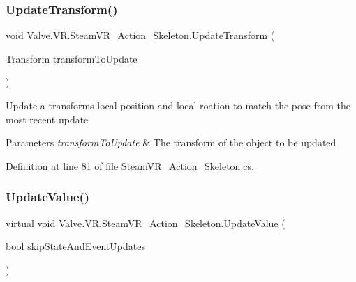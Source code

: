 \mbox{\label{class_valve_1_1_v_r_1_1_steam_v_r___action___skeleton_abe07333258dac738794a0be1b5b8683b}} 
\subsubsection{\texorpdfstring{UpdateTransform()}{UpdateTransform()}}
{\footnotesize\ttfamily void Valve.\+V\+R.\+Steam\+V\+R\+\_\+\+Action\+\_\+\+Skeleton.\+Update\+Transform (\begin{DoxyParamCaption}\item[{Transform}]{transform\+To\+Update }\end{DoxyParamCaption})}



Update a transform\textquotesingle{}s local position and local roation to match the pose from the most recent update 


\begin{DoxyParams}{Parameters}
{\em transform\+To\+Update} & The transform of the object to be updated\\
\hline
\end{DoxyParams}


Definition at line 81 of file Steam\+V\+R\+\_\+\+Action\+\_\+\+Skeleton.\+cs.

\mbox{\label{class_valve_1_1_v_r_1_1_steam_v_r___action___skeleton_ad4db27ce0ec44f65857ad24367fb1a27}} 
\subsubsection{\texorpdfstring{UpdateValue()}{UpdateValue()}}
{\footnotesize\ttfamily virtual void Valve.\+V\+R.\+Steam\+V\+R\+\_\+\+Action\+\_\+\+Skeleton.\+Update\+Value (\begin{DoxyParamCaption}\item[{bool}]{skip\+State\+And\+Event\+Updates }\end{DoxyParamCaption})\hspace{0.3cm}{\ttfamily [virtual]}}



